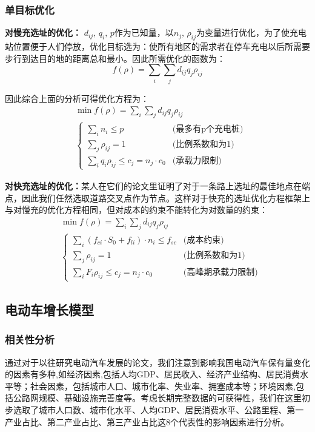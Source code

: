 \documentclass[12pt, a4paper, oneside]{ctexart}
\begin{document}
\subsubsection{单目标优化}
\textbf{对慢充选址的优化：}
\(d_{ij},\,q_i,\,p\)作为已知量，以\(n_j,\,\rho_{ij}\)为变量进行优化，为了使充电站位置便于人们停放，优化目标选为：使所有地区的需求者在停车充电以后所需要步行到达目的地的距离总和最小。因此所需优化的函数为：
\begin{dmath}
    f(\rho)=\sum_i \sum_jd_{ij} q_j \rho_{ij}
\end{dmath}

因此综合上面的分析可得优化方程为：
\begin{align*}
     & \min  f(\rho)=\sum_i \sum_jd_{ij} q_j \rho_{ij} \\
     & \begin{cases}
        \sum\limits_i n_i\leqslant p                                     & \text{(最多有p个充电桩)} \\
        \sum\limits_j \rho_{ij}=1                               & \text{(比例系数和为1)} \\
        \sum\limits_i q_{i}\rho_{ij}\leqslant c_j=n_j \cdot c_0 & \text{(承载力限制)}
    \end{cases}
\end{align*}

\textbf{对快充选址的优化：}某人在它们的论文里证明了对于一条路上选址的最佳地点在端点，因此我们任然选取道路交叉点作为节点。这样对于快充的选址优化方程框架上与对慢充的优化方程相同，但对成本的约束不能转化为对数量的约束：
\begin{align*}
    & \min  f(\rho)=\sum_i \sum_jd_{ij} q_j \rho_{ij} \\
    & \begin{cases}
        \sum\limits_{i}(f_{ci}\cdot S_0+f_{li})\cdot n_i\leqslant f_{sc}                                    & \text{(成本约束)} \\
       \sum\limits_j \rho_{ij}=1                               & \text{(比例系数和为1)} \\
       \sum\limits_i F_{i}\rho_{ij}\leqslant c_j=n_j \cdot c_0 & \text{(高峰期承载力限制)}
   \end{cases}
\end{align*}
\subsection{电动车增长模型}
\subsubsection{相关性分析}
通过对于以往研究电动汽车发展的论文，我们注意到影响我国电动汽车保有量变化的因素有多种,如经济因素,包括人均GDP、居民收入、经济产业结构、居民消费水平等；社会因素，包括城市人口、城市化率、失业率、拥塞成本等；环境因素,包括公路网规模、基础设施完善度等。考虑长期完整数据的可获得性，我们在这里初步选取了城市人口数、城市化水平、人均GDP、居民消费水平、公路里程、第一产业占比、第二产业占比、第三产业占比这8个代表性的影响因素进行分析。
\end{document}
